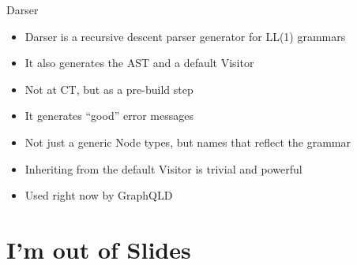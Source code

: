 \documentclass[aspectratio=169]{beamer}
\begin{document}
	\begin{frame}{Darser \hfill\cite{darser}}
		\begin{itemize}
			\item Darser is a recursive descent parser generator for LL(1) grammars
			\item It also generates the AST and a default Visitor
			\item Not at CT, but as a pre-build step\\[1cm]\pause
			\item It generates ``good'' error messages
			\item Not just a generic Node types, but names that reflect the grammar
			\item Inheriting from the default Visitor is trivial and powerful
			\item Used right now by GraphQLD
		\end{itemize}
	\end{frame}

	\section{I'm out of Slides}
\end{document}
